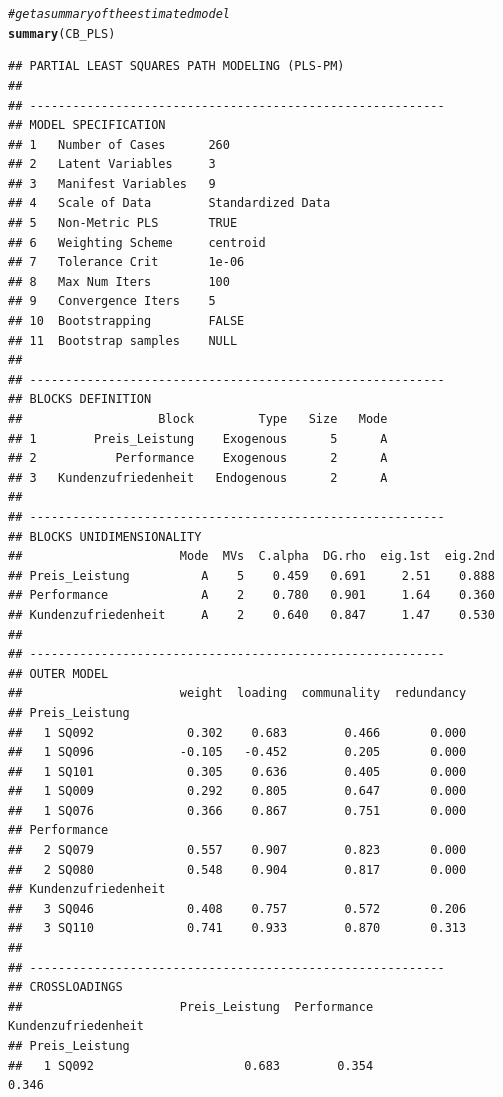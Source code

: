 \documentclass{article}\usepackage[]{graphicx}\usepackage[]{color}
\makeatletter
\newcommand{\hlcom}[1]{\textcolor[rgb]{0.678,0.584,0.686}{\textit{#1}}}%
\newcommand{\hlstd}[1]{\textcolor[rgb]{0.345,0.345,0.345}{#1}}%
\newcommand{\hlkwd}[1]{\textcolor[rgb]{0.737,0.353,0.396}{\textbf{#1}}}%
\newenvironment{kframe}{%
 \def\at@end@of@kframe{}%
 \ifinner\ifhmode%
  \def\at@end@of@kframe{\end{minipage}}%
  \begin{minipage}{\columnwidth}%
 \fi\fi%
 \def\FrameCommand##1{\hskip\@totalleftmargin \hskip-\fboxsep
 \colorbox{shadecolor}{##1}\hskip-\fboxsep
     \hskip-\linewidth \hskip-\@totalleftmargin \hskip\columnwidth}%
 \MakeFramed {\advance\hsize-\width
   \@totalleftmargin\z@ \linewidth\hsize
   \@setminipage}}%
 {\par\unskip\endMakeFramed%
 \at@end@of@kframe}
\newenvironment{knitrout}{}{} %
\makeatother
\begin{document}
\begin{knitrout}
\begin{kframe}
\begin{alltt}
\hlcom{#get a summary of the estimated model}
\hlkwd{summary}\hlstd{(CB_PLS)}
\end{alltt}
\begin{verbatim}
## PARTIAL LEAST SQUARES PATH MODELING (PLS-PM) 
## 
## ---------------------------------------------------------- 
## MODEL SPECIFICATION 
## 1   Number of Cases      260 
## 2   Latent Variables     3 
## 3   Manifest Variables   9 
## 4   Scale of Data        Standardized Data 
## 5   Non-Metric PLS       TRUE 
## 6   Weighting Scheme     centroid 
## 7   Tolerance Crit       1e-06 
## 8   Max Num Iters        100 
## 9   Convergence Iters    5 
## 10  Bootstrapping        FALSE 
## 11  Bootstrap samples    NULL 
## 
## ---------------------------------------------------------- 
## BLOCKS DEFINITION 
##                   Block         Type   Size   Mode
## 1        Preis_Leistung    Exogenous      5      A
## 2           Performance    Exogenous      2      A
## 3   Kundenzufriedenheit   Endogenous      2      A
## 
## ---------------------------------------------------------- 
## BLOCKS UNIDIMENSIONALITY 
##                      Mode  MVs  C.alpha  DG.rho  eig.1st  eig.2nd
## Preis_Leistung          A    5    0.459   0.691     2.51    0.888
## Performance             A    2    0.780   0.901     1.64    0.360
## Kundenzufriedenheit     A    2    0.640   0.847     1.47    0.530
## 
## ---------------------------------------------------------- 
## OUTER MODEL 
##                      weight  loading  communality  redundancy
## Preis_Leistung                                               
##   1 SQ092             0.302    0.683        0.466       0.000
##   1 SQ096            -0.105   -0.452        0.205       0.000
##   1 SQ101             0.305    0.636        0.405       0.000
##   1 SQ009             0.292    0.805        0.647       0.000
##   1 SQ076             0.366    0.867        0.751       0.000
## Performance                                                  
##   2 SQ079             0.557    0.907        0.823       0.000
##   2 SQ080             0.548    0.904        0.817       0.000
## Kundenzufriedenheit                                          
##   3 SQ046             0.408    0.757        0.572       0.206
##   3 SQ110             0.741    0.933        0.870       0.313
## 
## ---------------------------------------------------------- 
## CROSSLOADINGS 
##                      Preis_Leistung  Performance  Kundenzufriedenheit
## Preis_Leistung                                                       
##   1 SQ092                     0.683        0.354                0.346

\end{verbatim}
\end{kframe}
\end{knitrout}
\end{document}

